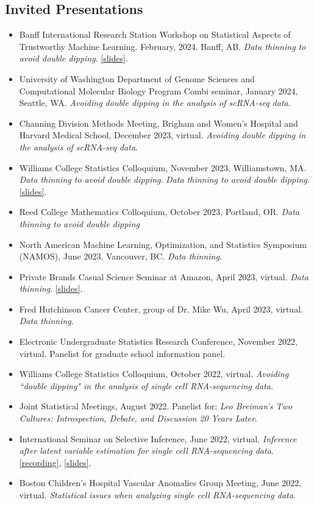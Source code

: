 \documentclass[margin, 10pt]{res}
\begin{document}
\begin{resume}
\section{Invited Presentations} 
\begin{itemize}
\item Banff International Research Station Workshop on Statistical Aspects of Trustworthy Machine Learning. February, 2024. Banff, AB. \emph{Data thinning to avoid double dipping}. \href{https://anna-neufeld.github.io/slides/BIRS.pdf}{[slides]}. 
\item University of Washington Department of Genome Sciences and Computational Molecular Biology Program Combi seminar, January 2024, Seattle, WA. \emph{Avoiding double dipping in the analysis of scRNA-seq data}.
\item Channing Division Methods Meeting, Brigham and Women's Hospital and Harvard Medical School, December 2023, virtual. \emph{Avoiding double dipping in the analysis of scRNA-seq data}.
\item Williams College Statistics Colloquium, November 2023, Williamstown, MA. \emph{Data thinning to avoid double dipping}. \emph{Data thinning to avoid double dipping}. \href{https://anna-neufeld.github.io/slides/jobtalk.pdf}{[slides]}.
\item Reed College Mathematics Colloquium, October 2023, Portland, OR. \emph{Data thinning to avoid double dipping}
\item North American Machine Learning, Optimization, and Statistics Symposium (NAMOS), June 2023, Vancouver, BC. \emph{Data thinning}. 
\item Private Brands Casual Science Seminar at Amazon, April 2023, virtual. \emph{Data thinning}. \href{https://anna-neufeld.github.io/slides/amazon.pdf}{[slides]}. 
\item Fred Hutchinson Cancer Center, group of Dr. Mike Wu, April 2023, virtual. \emph{Data thinning}. 
\item Electronic Undergraduate Statistics Research Conference, November 2022, virtual. Panelist for graduate school information panel. 
\item Williams College Statistics Colloquium, October 2022, virtual. \emph{Avoiding ``double dipping" in the analysis of single cell RNA-sequencing data.} 
\item Joint Statistical Meetings, August 2022. Panelist for: \emph{Leo Breiman's Two Cultures: Introspection, Debate, and Discussion 20 Years Later}. 
\item International Seminar on Selective Inference, June 2022, virtual. \emph{Inference after latent variable estimation for single cell RNA-sequencing data}. \href{https://drive.google.com/file/d/1U4s7xiuz5yOCeDL2hjfIPZPbD7EsmINb/view}{[recording]}, \href{https://drive.google.com/file/d/1KPX8TkT85jHYalxhieyy65PAj18PRbFF/view}{[slides]}.
\item Boston Children's Hospital Vascular Anomalies Group Meeting, June 2022, virtual. \emph{Statistical issues when analyzing single cell RNA-sequencing data}. 
\end{itemize}

\end{resume}
\end{document}
